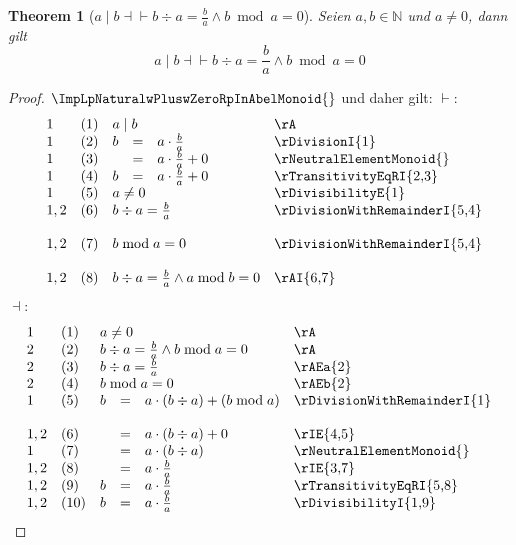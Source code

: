 \documentclass{book}
\theoremstyle{plain}
\newtheorem{theorem}{Theorem}
\theoremstyle{remark}
\theoremstyle{definition}
\begin{document}
\label{awbInNaturalwaNotEqualsZerowaMidbEqvbDivaEqualsLpbRpDurchLpaRpAndbModaEqualsZero}
\begin{theorem}[\(a\mid b\dashv\vdash b\div a=\frac{b}{a}\land b\bmod a=0\)]
Seien \(a,b\in\mathbb{N}\) und \(a\neq 0\), dann gilt
\[a\mid b\dashv\vdash b\div a=\frac{b}{a}\land b\bmod a=0\]
\end{theorem}
\begin{proof}
\(\ImpLpNaturalwPluswZeroRpInAbelMonoid{}\) und daher gilt:
\(\vdash\):
    \[
	\begin{array}{llcll p{5cm}}
            1 &  (1)  & \multicolumn{3}{l}{a\mid b} & \rA \\
            1 &  (2)  & b&=&a\cdot\frac{b}{a} & \rDivisionI{1} \\
            1 &  (3)  &  &=&a\cdot\frac{b}{a}+0 & \rNeutralElementMonoid{} \\
            1 &  (4)  & b &=&a\cdot\frac{b}{a}+0 & \rTransitivityEqRI{2,3} \\
            1 &  (5)  &  \multicolumn{3}{l}{a\neq 0} & \rDivisibilityE{1} \\
            1,2 &  (6)  & \multicolumn{3}{l}{b\div a=\frac{b}{a}} & \rDivisionWithRemainderI{5,4} \\
            1,2 &  (7)  & \multicolumn{3}{l}{b\bmod a=0} & \rDivisionWithRemainderI{5,4} \\
            1,2 &  (8)  &  \multicolumn{3}{l}{b\div a=\frac{b}{a}\land a\bmod b=0} & \rAI{6,7} \\
        \end{array}
    \]
\(\dashv\):
    \[
	\begin{array}{llcll p{5cm}}
            1 &  (1)  & \multicolumn{3}{l}{a\neq 0} & \rA \\
            2 &  (2)  & \multicolumn{3}{l}{ b\div a=\frac{b}{a}\land b\bmod a=0} & \rA \\
            2 &  (3)  & \multicolumn{3}{l}{ b\div a=\frac{b}{a}} & \rAEa{2} \\
            2 &  (4)  & \multicolumn{3}{l}{ b\bmod a=0} & \rAEb{2} \\
            1 &  (5)  & b&=&a\cdot (b\div a)+ (b\bmod a) & \rDivisionWithRemainderI{1} \\
            1,2 &  (6)  &  &=&a\cdot (b\div a)+ 0 & \rIE{4,5} \\
            1 &  (7)  &  &=&a\cdot (b\div a) & \rNeutralElementMonoid{} \\
            1,2 &  (8)  &  &=&a\cdot \frac{b}{a} & \rIE{3,7} \\
            1,2 &  (9)  &  b&=&a\cdot \frac{b}{a} & \rTransitivityEqRI{5,8} \\
            1,2 &  (10)  &  b&=&a\cdot \frac{b}{a} & \rDivisibilityI{1,9} \\
        \end{array}
    \]
\end{proof}
\end{document}
